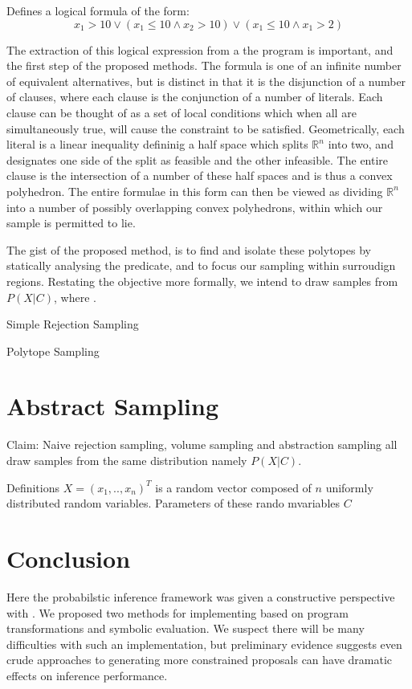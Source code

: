 Defines a logical formula of the form:
\begin{equation}
x_1 > 10 \lor (x_1 \le 10 \land x_2 > 10) \lor (x_1 \le 10 \land x_1 > 2)
\end{equation}

The extraction of this logical expression from a the program is important, and the first step of the proposed methods.
The formula is one of an infinite number of equivalent alternatives, but is distinct in that it is the disjunction of a number of clauses, where each clause is the conjunction of a number of literals.
Each clause can be thought of as a set of local conditions which when all are simultaneously true, will cause the constraint to be satisfied.
Geometrically, each literal is a linear inequality defininig a half space which splits $\mathbb{R}^n$ into two, and designates one side of the split as feasible and the other infeasible.
The entire clause is the intersection of a number of these half spaces and is thus a convex polyhedron.
The entire formulae in this form can then be viewed as dividing $\mathbb{R}^n$ into a number of possibly overlapping convex polyhedrons, within which our sample is permitted to lie.

The gist of the proposed method, is to find and isolate these polytopes by statically analysing the predicate, and to focus our sampling within surroudign regions.
Restating the objective more formally, we intend to draw samples from $P(X \vert C)$, where   .

Simple Rejection Sampling

Polytope Sampling

\section{Abstract Sampling}

Claim: Naive rejection sampling, volume sampling and abstraction sampling all draw samples from the same distribution namely $P(X | C)$.

Definitions
$X = (x_1,..,x_n)^T$ is a random vector composed of $n$ uniformly distributed random variables.
Parameters of these rando mvariables
$C$


\section{Conclusion}
Here the probabilstic inference framework  was given a constructive perspective with .
We proposed two methods for implementing  based on program transformations and symbolic evaluation.
We suspect there will be many difficulties with such an implementation, but preliminary evidence suggests even crude approaches to generating more constrained proposals can have dramatic effects on inference performance.

